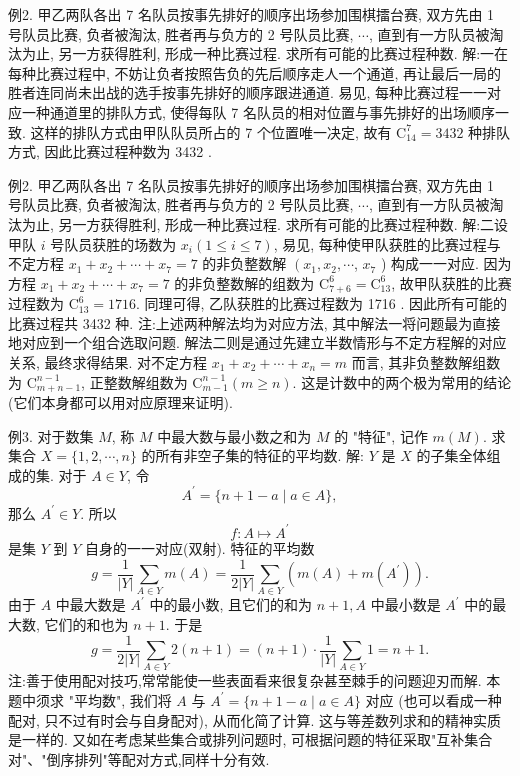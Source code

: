 例2. 甲乙两队各出 7 名队员按事先排好的顺序出场参加围棋擂台赛, 双方先由 1 号队员比赛, 负者被淘汰, 胜者再与负方的 2 号队员比赛, $\cdots$, 直到有一方队员被淘汰为止, 另一方获得胜利, 形成一种比赛过程.
求所有可能的比赛过程种数.
解:一在每种比赛过程中, 不妨让负者按照告负的先后顺序走人一个通道, 再让最后一局的胜者连同尚未出战的选手按事先排好的顺序跟进通道.
易见, 每种比赛过程一一对应一种通道里的排队方式, 使得每队 7 名队员的相对位置与事先排好的出场顺序一致.
这样的排队方式由甲队队员所占的 7 个位置唯一决定, 故有 $\mathrm{C}_{14}^7=3432$ 种排队方式, 因此比赛过程种数为 3432 .



例2. 甲乙两队各出 7 名队员按事先排好的顺序出场参加围棋擂台赛, 双方先由 1 号队员比赛, 负者被淘汰, 胜者再与负方的 2 号队员比赛, $\cdots$, 直到有一方队员被淘汰为止, 另一方获得胜利, 形成一种比赛过程.
求所有可能的比赛过程种数.
解:二设甲队 $i$ 号队员获胜的场数为 $x_i(1 \leqslant i \leqslant 7)$, 易见, 每种使甲队获胜的比赛过程与不定方程 $x_1+x_2+\cdots+x_7=7$ 的非负整数解 $\left(x_1, x_2, \cdots\right.$, $x_7$ ) 构成一一对应.
因为方程 $x_1+x_2+\cdots+x_7=7$ 的非负整数解的组数为 $\mathrm{C}_{7+6}^6=\mathrm{C}_{13}^6$, 故甲队获胜的比赛过程数为 $\mathrm{C}_{13}^6=1716$. 同理可得, 乙队获胜的比赛过程数为 1716 . 因此所有可能的比赛过程共 3432 种.
注:上述两种解法均为对应方法, 其中解法一将问题最为直接地对应到一个组合选取问题.
解法二则是通过先建立半数情形与不定方程解的对应关系, 最终求得结果.
对不定方程 $x_1+x_2+\cdots+x_n=m$ 而言, 其非负整数解组数为 $\mathrm{C}_{m+n-1}^{n-1}$, 正整数解组数为 $\mathrm{C}_{m-1}^{n-1}(m \geqslant n)$. 这是计数中的两个极为常用的结论 (它们本身都可以用对应原理来证明).



例3. 对于数集 $M$, 称 $M$ 中最大数与最小数之和为 $M$ 的 "特征", 记作 $m(M)$. 求集合 $X=\{1,2, \cdots, n\}$ 的所有非空子集的特征的平均数.
解: $Y$ 是 $X$ 的子集全体组成的集.
对于 $A \in Y$, 令
$$
A^{\prime}=\{n+1-a \mid a \in A\},
$$
那么 $A^{\prime} \in Y$. 所以
$$
f: A \mapsto A^{\prime}
$$
是集 $Y$ 到 $Y$ 自身的一一对应(双射).
特征的平均数
$$
g=\frac{1}{|Y|} \sum_{A \in Y} m(A)=\frac{1}{2|Y|} \sum_{A \in Y}\left(m(A)+m\left(A^{\prime}\right)\right) .
$$
由于 $A$ 中最大数是 $A^{\prime}$ 中的最小数, 且它们的和为 $n+1, A$ 中最小数是 $A^{\prime}$ 中的最大数, 它们的和也为 $n+1$. 于是
$$
g=\frac{1}{2|Y|} \sum_{A \in Y} 2(n+1)=(n+1) \cdot \frac{1}{|Y|} \sum_{A \in Y} 1=n+1 .
$$
注:善于使用配对技巧,常常能使一些表面看来很复杂甚至棘手的问题迎刃而解.
本题中须求 "平均数", 我们将 $A$ 与 $A^{\prime}=\{n+1-a \mid a \in A\}$ 对应 (也可以看成一种配对, 只不过有时会与自身配对), 从而化简了计算.
这与等差数列求和的精神实质是一样的.
又如在考虑某些集合或排列问题时, 可根据问题的特征采取"互补集合对"、"倒序排列"等配对方式,同样十分有效.



